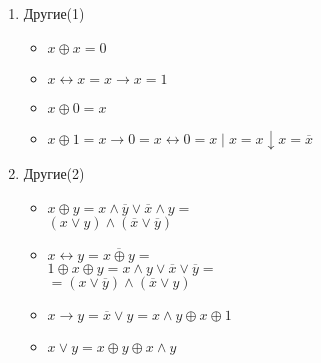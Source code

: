\begin{minipage}[t]{0.5\textwidth}
\begin{enumerate}
            \item Другие(1)\\
            \begin{itemize}[topsep=-1cm, leftsep=-1cm, leftmargin=0.1cm]
                \setlength\itemsep{0cm}
                \item $x \oplus x = 0$\\
                \item $x \leftrightarrow x = x \rightarrow x = 1$\\
                \item $x \oplus 0 = x$\\
                \item $x \oplus 1 = x \rightarrow 0 = x \leftrightarrow 0 = x \mid x = x \downarrow x = \overline x$
            \end{itemize}
            \item Другие(2)\\
            \begin{itemize}[topsep=-1cm, leftsep=-1cm, leftmargin=0.1cm]
                \setlength\itemsep{0cm}
                \item $x \oplus y = x \wedge \overline y \vee \overline x \wedge y =$\\
                $(x \vee y) \wedge (\overline x \vee \overline y)$\\

                \item $x \leftrightarrow y  = \overline{x \oplus y} = $\\
                $1 \oplus x \oplus y = x \wedge y \vee \overline x \vee \overline y = $\\
                $= (x \vee \overline y) \wedge (\overline x \vee y)$\\

                \item $x \rightarrow y = \overline x \vee y = x \wedge y \oplus x \oplus 1$

                \item $x \vee y = x \oplus y \oplus x \wedge y$
            \end{itemize}



            $$
        \end{enumerate}
    \end{minipage}

